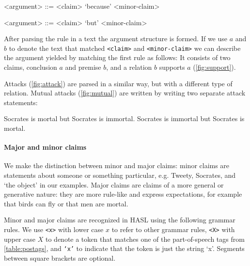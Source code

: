 \begin{grammar}
<argument> ::= <claim> `because' <minor-claim> %

<argument> ::= <claim> `but' <minor-claim> %
\end{grammar}

\noindent After parsing the rule in a text the argument structure is formed. If we use $a$ and $b$ to denote the text that matched \texttt{<claim>} and \texttt{<minor-claim>} we can describe the argument yielded by matching the first rule as follows: It consists of two claims, conclusion $a$ and premise $b$, and a relation $b$ supports $a$ (\autoref{fig:support}).

Attacks (\autoref{fig:attack}) are parsed in a similar way, but with a different type of relation. Mutual attacks (\autoref{fig:mutual}) are written by writing two separate attack statements:

\begin{exe}
    \ex\label{ex:mutualsoc} Socrates is mortal but Socrates is immortal. Socrates is immortal but Socrates is mortal.
\end{exe}


\paragraph{Major and minor claims}
We make the distinction between minor and major claims: minor claims are statements about someone or something particular, e.g. Tweety, Socrates, and `the object' in our examples. Major claims are claims of a more general or generative nature: they are more rule-like and express expectations, for example that birds can fly or that men are mortal.

Minor and major claims are recognized in HASL using the following grammar rules. We use \texttt{<x>} with lower case $x$ to refer to other grammar rules, \texttt{<X>} with upper case $X$ to denote a token that matches one of the part-of-speech tags from \autoref{table:postags}, and \texttt{`x'} to indicate that the token is just the string `x'. Segments between square brackets are optional.

